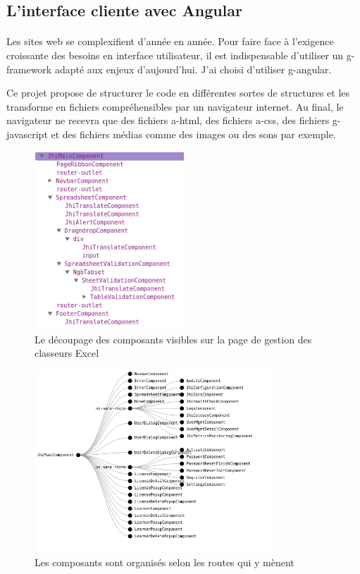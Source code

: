 \subsection{L'interface cliente avec Angular}
\label{subsec:frontend-angular}

\paragraph{}
Les sites web se complexifient d'année en année.
Pour faire face à l'exigence croissante des besoins en interface utilisateur, il est indispensable d'utiliser un \gls{g-framework} adapté aux enjeux d'aujourd'hui.
J'ai choisi d'utiliser \Gls{g-angular}.

Ce projet propose de structurer le code en différentes sortes de structures et les transforme en fichiers compréhensibles par un navigateur internet.
Au final, le navigateur ne recevra que des fichiers \gls{a-html}, des fichiers \gls{a-css}, des fichiers \gls{g-javascript} et des fichiers médias comme des images ou des sons par exemple.

\begin{figure}[ht]
    \centering
    \includegraphics[width=0.5\textwidth]{images/diagrams/angular-components.png}
    \caption{Le découpage des composants visibles sur la page de gestion des classeurs Excel}
    \label{fig:angular-components}
\end{figure}

\begin{figure}[ht]
    \centering
    \includegraphics[width=0.8\textwidth]{images/diagrams/angular-routes.png}
    \caption{Les composants sont organisés selon les routes qui y mènent}
    \label{fig:angular-routes}
\end{figure}


